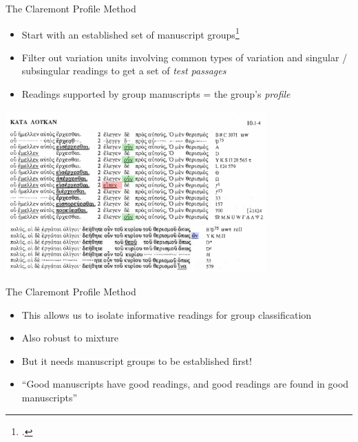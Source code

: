 \documentclass[10pt]{beamer}
\begin{document}
	\begin{frame}{The Claremont Profile Method}
		\begin{itemize}
			\item Start with an established set of manuscript groups\footnote{\cite{Wisse82}.}
			\item Filter out variation units involving common types of variation and singular / subsingular readings to get a set of \emph{test passages}
			\item Readings supported by group manuscripts = the group's \emph{profile}
		\end{itemize}
		\begin{center}
			\includegraphics[width=0.75\textwidth]{../graphics/swanson_scan_luke_10_2_cpm.png}
		\end{center}
	\end{frame}
	\begin{frame}{The Claremont Profile Method}
		\begin{itemize}
			\item This allows us to isolate informative readings for group classification
			\item Also robust to mixture
			\item But it needs manuscript groups to be established first!
			\item ``Good manuscripts have good readings, and good readings are found in good manuscripts''
		\end{itemize}
		\begin{center}
		\end{center}
	\end{frame}
\end{document}
